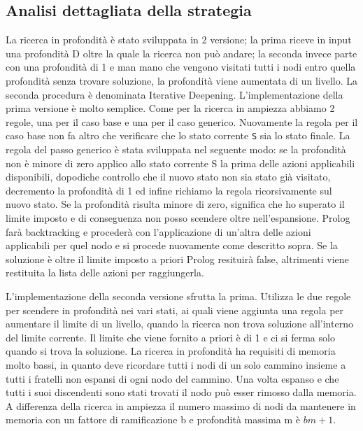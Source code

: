 \subsection{Analisi dettagliata della strategia}

La ricerca in profondità è stato sviluppata in 2 versione; la prima riceve in input una profondità D oltre la quale la ricerca non può andare; la seconda invece parte con una profondità di 1 e man mano che vengono visitati tutti i nodi entro quella profondità senza trovare soluzione, la profondità viene aumentata di un livello. La seconda procedura è denominata Iterative Deepening.
L'implementazione della prima versione è molto semplice. Come per la ricerca in ampiezza abbiamo 2 regole, una per il caso base e una per il caso generico. Nuovamente la regola per il caso base non fa altro che verificare che lo stato corrente \lstinline{S} sia lo stato finale. La regola del passo generico è stata sviluppata nel seguente modo: se la profondità non è minore di zero applico allo stato corrente S la prima delle azioni applicabili disponibili, dopodiche controllo che il nuovo stato non sia stato già visitato, decremento la profondità di 1 ed infine richiamo la regola ricorsivamente sul nuovo stato. Se la profondità risulta minore di zero, significa che ho superato il limite imposto e di conseguenza non posso scendere oltre nell'espansione.
Prolog farà backtracking e procederà con l'applicazione di un'altra delle azioni applicabili per quel nodo e si procede nuovamente come descritto sopra. Se la soluzione è oltre il limite imposto a priori Prolog resituirà false, altrimenti viene restituita la lista delle azioni per raggiungerla.

L'implementazione della seconda versione sfrutta la prima. Utilizza le due regole per scendere in profondità nei vari stati, ai quali viene aggiunta una regola per aumentare il limite di un livello, quando la ricerca non trova soluzione all'interno del limite corrente. Il limite che viene fornito a priori è di 1 e ci si ferma solo quando si trova la soluzione.
La ricerca in profondità ha requisiti di memoria molto bassi, in quanto deve ricordare tutti i nodi di un solo cammino insieme a tutti i fratelli non espansi di ogni nodo del cammino. Una volta espanso e che tutti i suoi discendenti sono stati trovati il nodo può esser rimosso dalla memoria. A differenza della ricerca in ampiezza il numero massimo di nodi da mantenere in memoria con un fattore di ramificazione b e profondità massima m è \begin{math}bm + 1\end{math}.


